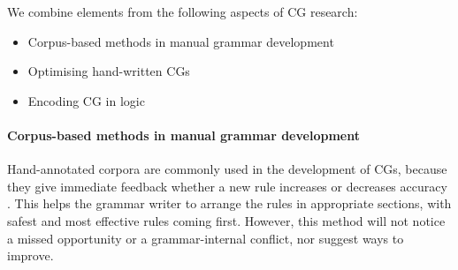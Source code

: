 We combine elements from the following aspects of CG research:

\begin{itemize}
\item Corpus-based methods in manual grammar development \cite{voutilainen2004}
\item Optimising hand-written CGs~\cite{bick2013tuning}
\item Encoding CG in logic \cite{lager98,lager_nivre01,listenmaa_claessen2015}
\end{itemize}



\paragraph{Corpus-based methods in manual grammar development}

Hand-annotated corpora are commonly used in the development of CGs, because they give immediate feedback whether a new rule increases or decreases accuracy \cite{voutilainen2004}.
This helps the grammar writer to arrange the rules in appropriate sections, with safest and most effective rules coming first.
However, this method will not notice a missed opportunity or a grammar-internal conflict, nor suggest ways to improve.




